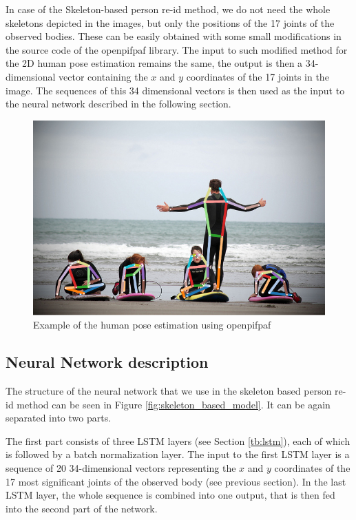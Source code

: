 In case of the Skeleton-based person re-id method, we do not need the whole skeletons depicted in the images, but only the positions of the 17 joints of the observed bodies. These can be easily obtained with some small modifications in the source code of the openpifpaf library. The input to such modified method for the 2D human pose estimation remains the same, the output is then a 34-dimensional vector containing the $x$ and $y$ coordinates of the 17 joints in the image. The sequences of this 34 dimensional vectors is then used as the input to the neural network described in the following section.

\begin{figure}[h!]
    \centering
    \includegraphics[scale=0.4]{figures/skeleton.png}
    \caption{Example of the human pose estimation using openpifpaf}
    \label{fig:kreiss2019pifpaf}
\end{figure}


\subsection{Neural Network description}
The structure of the neural network that we use in the skeleton based person re-id method can be seen in Figure \ref{fig:skeleton_based_model}. It can be again separated into two parts.

The first part consists of three LSTM layers (see Section \ref{tb:lstm}), each of which is followed by a batch normalization layer. The input to the first LSTM layer is a sequence of 20 34-dimensional vectors representing the $x$ and $y$ coordinates of the 17 most significant joints of the observed body (see previous section). In the last LSTM layer, the whole sequence is combined into one output, that is then fed into the second part of the network.


